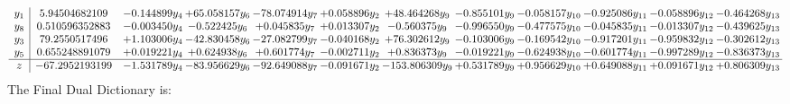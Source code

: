 \documentclass[11pt]{article}
\begin{document}
\[\begin{array}{c| c c@{\hskip 2pt} c@{\hskip 2pt} c@{\hskip 2pt} c@{\hskip 2pt} c@{\hskip 2pt} c@{\hskip 2pt} c@{\hskip 2pt} c@{\hskip 2pt} c@{\hskip 2pt} c@{\hskip 2pt} }
 y_{1}   &  5.94504682109 & -0.144899 y_{4} & + 65.058157 y_{6} & -78.074914 y_{7} & + 0.058896 y_{2} & + 48.464268 y_{9} & -0.855101 y_{9} & -0.058157 y_{10} & -0.925086 y_{11} & -0.058896 y_{12} & -0.464268 y_{13}\\
 y_{8}   &  0.510596352883 & -0.003450 y_{4} & -0.522425 y_{6} & + 0.045835 y_{7} & + 0.013307 y_{2} & -0.560375 y_{9} & -0.996550 y_{9} & -0.477575 y_{10} & -0.045835 y_{11} & -0.013307 y_{12} & -0.439625 y_{13}\\
 y_{3}   &  79.2550517496 & + 1.103006 y_{4} & -42.830458 y_{6} & -27.082799 y_{7} & -0.040168 y_{2} & + 76.302612 y_{9} & -0.103006 y_{9} & -0.169542 y_{10} & -0.917201 y_{11} & -0.959832 y_{12} & -0.302612 y_{13}\\
 y_{5}   &  0.655248891079 & + 0.019221 y_{4} & + 0.624938 y_{6} & + 0.601774 y_{7} & -0.002711 y_{2} & + 0.836373 y_{9} & -0.019221 y_{9} & -0.624938 y_{10} & -0.601774 y_{11} & -0.997289 y_{12} & -0.836373 y_{13}\\
\hline
z    &  -67.2952193199 & -1.531789 y_{4} & -83.956629 y_{6} & -92.649088 y_{7} & -0.091671 y_{2} & -153.806309 y_{9} & + 0.531789 y_{9} & + 0.956629 y_{10} & + 0.649088 y_{11} & + 0.091671 y_{12} & + 0.806309 y_{13}\\
\end{array}\]
The Final Dual Dictionary is: 
\end{document}
